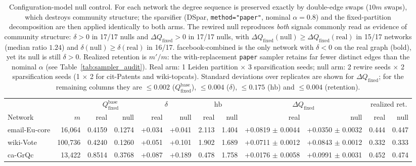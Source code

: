 \begin{table}[t]
\centering
\setlength{\tabcolsep}{3pt}
\caption{Configuration-model null control. For each network the degree sequence is preserved
exactly by double-edge swaps ($10m$ swaps), which destroys community structure; the sparsifier
(DSpar, \texttt{method="paper"}, nominal $\alpha=0.8$) and the fixed-partition decomposition are
then applied identically to both arms. The rewired null reproduces \emph{both} signals commonly
read as evidence of community structure: $\delta>0$ in 17/17 nulls and $\Delta Q_{\mathrm{fixed}}>0$
in 17/17 nulls, with $\Delta Q_{\mathrm{fixed}}(\mathrm{null})\ge\Delta Q_{\mathrm{fixed}}(\mathrm{real})$
in 15/17 networks (median ratio $1.24$) and $\delta(\mathrm{null})\ge\delta(\mathrm{real})$ in 16/17.
facebook-combined is the only network with $\delta<0$ on the real graph (bold), yet its null is still
$\delta>0$. Realized retention is $m'/m$: the with-replacement \texttt{paper} sampler retains far
fewer distinct edges than the nominal $\alpha$ (see Table~\ref{tab:sampler_audit}).
Real arm: 1 Leiden partition $\times$ 3 sparsification seeds; null arm: 2 rewire seeds $\times$
2 sparsification seeds (1 $\times$ 2 for cit-Patents and wiki-topcats). Standard deviations over
replicates are shown for $\Delta Q_{\mathrm{fixed}}$; for the remaining columns they are
$\le 0.002$ ($Q_{\mathrm{fixed}}^{\mathrm{base}}$), $\le 0.004$ ($\delta$), $\le 0.175$ ($\mathrm{hb}$) and
$\le 0.004$ (retention).}
\label{tab:null_control}
\footnotesize
\begin{tabular}{lrrrrrrrrrrr}
\toprule
 & & \multicolumn{2}{c}{$Q_{\mathrm{fixed}}^{\mathrm{base}}$} & \multicolumn{2}{c}{$\delta$}
 & \multicolumn{2}{c}{$\mathrm{hb}$} & \multicolumn{2}{c}{$\Delta Q_{\mathrm{fixed}}$}
 & \multicolumn{2}{c}{realized ret.} \\
\cmidrule(lr){3-4}\cmidrule(lr){5-6}\cmidrule(lr){7-8}\cmidrule(lr){9-10}\cmidrule(lr){11-12}
Network & $m$ & real & null & real & null & real & null & real & null & real & null \\
\midrule
email-Eu-core & 16,064 & 0.4159 & 0.1274 & +0.034 & +0.041 & 2.113 & 1.404 & +0.0819 $\pm$ 0.0044 & +0.0350 $\pm$ 0.0032 & 0.444 & 0.447 \\
wiki-Vote & 100,736 & 0.4240 & 0.1260 & +0.051 & +0.101 & 1.902 & 1.689 & +0.0711 $\pm$ 0.0012 & +0.0843 $\pm$ 0.0012 & 0.332 & 0.333 \\
ca-GrQc & 13,422 & 0.8514 & 0.3768 & +0.087 & +0.189 & 0.478 & 1.758 & +0.0176 $\pm$ 0.0058 & +0.0991 $\pm$ 0.0031 & 0.452 & 0.474 \\

\end{tabular}
\end{table}
